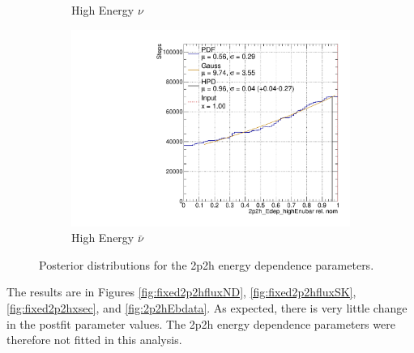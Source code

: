 \begin{figure}
\begin{subfigure}{.48\textwidth}
  \caption{High Energy $\nu$}
\end{subfigure}
\begin{subfigure}{.48\textwidth}
  \centering
  \includegraphics[width=0.73\linewidth]{figs/2p2h_Edep_highEnubar.pdf}
  \caption{High Energy $\bar{\nu}$}
\end{subfigure}
\caption{Posterior distributions for the 2p2h energy dependence parameters.}
\label{fig:2p2hEdepdist}
\end{figure}

The results are in Figures \ref{fig:fixed2p2hfluxND}, \ref{fig:fixed2p2hfluxSK}, \ref{fig:fixed2p2hxsec}, and \ref{fig:2p2hEbdata}. As expected, there is very little change in the postfit parameter values. The 2p2h energy dependence parameters were therefore not fitted in this analysis.


